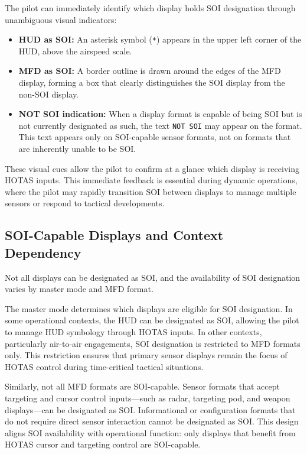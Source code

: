 \documentclass[11pt, a4paper, twoside]{report}
\begin{document}
The pilot can immediately identify which display holds SOI designation through unambiguous visual indicators:

\begin{itemize}
	\item \textbf{HUD as SOI:} An asterisk symbol (\texttt{*}) appears in the upper left corner of the HUD, above the airspeed scale.
	\item \textbf{MFD as SOI:} A border outline is drawn around the edges of the MFD display, forming a box that clearly distinguishes the SOI display from the non-SOI display.
	\item \textbf{NOT SOI indication:} When a display format is capable of being SOI but is not currently designated as such, the text \texttt{NOT SOI} may appear on the format. This text appears only on SOI-capable sensor formats, not on formats that are inherently unable to be SOI.
\end{itemize}

These visual cues allow the pilot to confirm at a glance which display is receiving HOTAS inputs. This immediate feedback is essential during dynamic operations, where the pilot may rapidly transition SOI between displays to manage multiple sensors or respond to tactical developments.

\subsection{SOI-Capable Displays and Context Dependency}
\label{sec:C2-S1-S3}

Not all displays can be designated as SOI, and the availability of SOI designation varies by master mode and MFD format.

The master mode determines which displays are eligible for SOI designation. In some operational contexts, the HUD can be designated as SOI, allowing the pilot to manage HUD symbology through HOTAS inputs. In other contexts, particularly air-to-air engagements, SOI designation is restricted to MFD formats only. This restriction ensures that primary sensor displays remain the focus of HOTAS control during time-critical tactical situations.

Similarly, not all MFD formats are SOI-capable. Sensor formats that accept targeting and cursor control inputs—such as radar, targeting pod, and weapon displays—can be designated as SOI. Informational or configuration formats that do not require direct sensor interaction cannot be designated as SOI. This design aligns SOI availability with operational function: only displays that benefit from HOTAS cursor and targeting control are SOI-capable.
\end{document}
